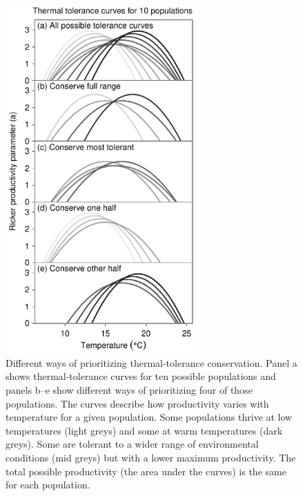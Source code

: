 \begin{figure}[htbp]
\centering
\includegraphics[width=2.9in]{metafolio/Fig2}
\caption{Different ways of prioritizing thermal-tolerance conservation. Panel a shows thermal-tolerance curves for ten possible populations and panels b--e show different ways of prioritizing four of those populations. The curves describe how productivity varies with temperature for a given population. Some populations thrive at low temperatures (light greys) and some at warm temperatures (dark greys). Some are tolerant to a wider range of environmental conditions (mid greys) but with a lower maximum productivity. The total possible productivity (the area under the curves) is the same for each population.} \label{f:curves}
\end{figure}


\clearpage

